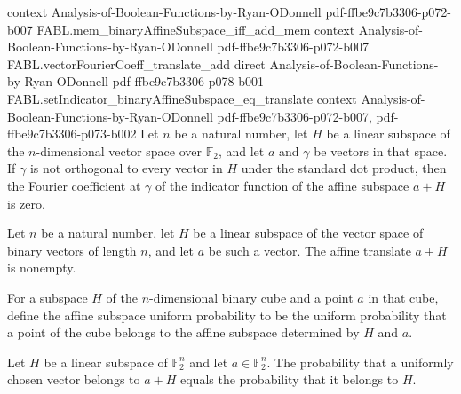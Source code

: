 \begin{theorem}
  {context}
  {Analysis-of-Boolean-Functions-by-Ryan-ODonnell}
  {pdf-ffbe9c7b3306-p072-b007}
\proofstep
  {FABL.mem_binaryAffineSubspace_iff_add_mem}
  {context}
  {Analysis-of-Boolean-Functions-by-Ryan-ODonnell}
  {pdf-ffbe9c7b3306-p072-b007}
\proofstep
  {FABL.vectorFourierCoeff_translate_add}
  {direct}
  {Analysis-of-Boolean-Functions-by-Ryan-ODonnell}
  {pdf-ffbe9c7b3306-p078-b001}
\proofstep
  {FABL.setIndicator_binaryAffineSubspace_eq_translate}
  {context}
  {Analysis-of-Boolean-Functions-by-Ryan-ODonnell}
  {pdf-ffbe9c7b3306-p072-b007,
    pdf-ffbe9c7b3306-p073-b002}
Let $n$ be a natural number, let $H$ be a linear subspace of the $n$-dimensional vector
space over $\mathbb{F}_2$, and let $a$ and $\gamma$ be vectors in that space. If
$\gamma$ is not orthogonal to every vector in $H$ under the standard dot product, then
the Fourier coefficient at $\gamma$ of the indicator function of the affine subspace
$a+H$ is zero.
\end{theorem}

\begin{theorem}
\label{FABL.binaryAffineSubspace_nonempty}
\leanok
{}
Let $n$ be a natural number, let $H$ be a linear subspace of the vector space of binary
vectors of length $n$, and let $a$ be such a vector. The affine translate $a+H$ is
nonempty.
\end{theorem}

\begin{definition}
\label{FABL.affineSubspaceUniformProbability}
\leanok
{}
For a subspace $H$ of the $n$-dimensional binary cube and a point $a$ in that cube,
define the affine subspace uniform probability to be the uniform probability that a
point of the cube belongs to the affine subspace determined by $H$ and $a$.
\end{definition}

\begin{theorem}
\label{FABL.affineSubspaceUniformProbability_eq_subspaceUniformProbability}
\leanok
{}
Let $H$ be a linear subspace of $\mathbb F_2^n$ and let $a\in\mathbb F_2^n$. The
probability that a uniformly chosen vector belongs to $a+H$ equals the probability that
it belongs to $H$.
\end{theorem}

